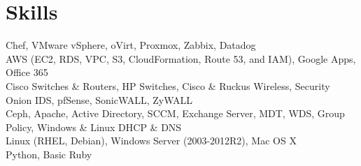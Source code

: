 \documentclass[]{deedy-resume-openfont}
\begin{document}
\begin{minipage}[t]{0.33\textwidth}
\section{Skills}
Chef, VMware vSphere, oVirt, Proxmox, Zabbix, Datadog \\
\vspace{5pt}
AWS (EC2, RDS, VPC, S3, CloudFormation, Route 53, and IAM), Google Apps, Office 365 \\
\vspace{5pt}
Cisco Switches \& Routers, HP Switches, Cisco \& Ruckus Wireless, Security Onion IDS, pfSense, SonicWALL, ZyWALL  \\
\vspace{5pt}
Ceph, Apache, Active Directory, SCCM, Exchange Server, MDT, WDS, Group Policy, Windows \& Linux DHCP \& DNS \\
\vspace{5pt}
Linux (RHEL, Debian), Windows Server (2003-2012R2), Mac OS X \\
\vspace{5pt}
Python, Basic Ruby
\sectionsep

%
%

\end{minipage} 
\hfill
\end{document}
